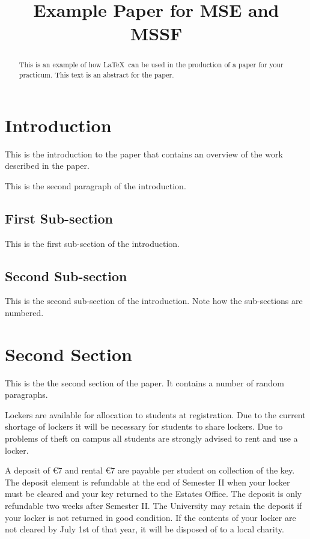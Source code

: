 \documentclass[conference,11pt]{IEEEtran}
\begin{document}
\title{Example Paper for MSE and MSSF}

\author{
\and
{}
\and
{}
}

\maketitle

\begin{abstract}
This is an example of how \LaTeX\ can be used in the production of
a paper for your practicum. This text is an abstract for the paper.
\end{abstract}

\section{Introduction}
This is the introduction to the paper that contains an overview of
the work described in the paper.

This is the second paragraph of the introduction.

\subsection{First Sub-section}
This is the first sub-section of the introduction.

\subsection{Second Sub-section}
This is the second sub-section of the introduction. Note how the
sub-sections are numbered.

\section{Second Section}
This is the the second section of the paper. It contains a number
of random paragraphs.

Lockers are available for allocation to students at registration.
Due to the current shortage of lockers it will be necessary for
students to share lockers. Due to problems of theft on campus all
students are strongly advised to rent and use a locker.

A deposit of \euro 7 and rental \euro 7 are payable per student on
collection of the key. The deposit element is refundable at the end
of Semester II when your locker must be cleared and your key returned
to the Estates Office. The deposit is only refundable two weeks after
Semester II. The University may retain the deposit if your locker is
not returned in good condition. If the contents of your locker are
not cleared by July 1st of that year, it will be disposed of to a
local charity.
\end{document}

